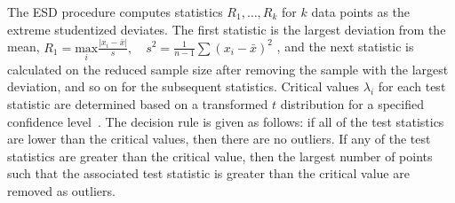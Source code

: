 \documentclass[10pt]{sigplanconf}
\begin{document}
\begin{enumerate}
\begin{itemize}
The ESD procedure computes statistics $R_1, \dots , R_k$ for $k$ data points as the extreme studentized deviates. The first statistic is the largest deviation from the mean, $R_1 = \underset{i}{\text{max}} \frac{\vert x_i - \bar{x} \vert }{s} , \quad s^2 = \frac{1}{n-1}\sum {(x_i - \bar{x})^2}$  , and the next statistic is calculated on the reduced sample size after removing the sample with the largest deviation, and so on for the subsequent statistics.  Critical values  $\lambda_i$  for each test statistic are determined based on a transformed $t$ distribution for a specified confidence level~\cite{rosner1983percentage}. The decision rule is given as follows: if all of the test statistics are lower than the critical values, then there are no outliers. If any of the test statistics are greater than the critical value, then the largest number of points such that the associated test statistic is greater than the critical value are removed as outliers.

\end{itemize}

\end{enumerate}


 
\end{document}

